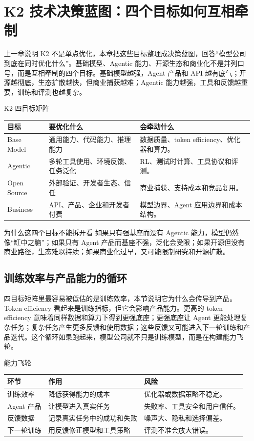 \section{K2 技术决策蓝图：四个目标如何互相牵制}

上一章说明 K2 不是单点优化，本章把这些目标整理成决策蓝图，回答“模型公司到底在同时优化什么”。基础模型、Agentic 能力、开源生态和商业化不是并列口号，而是互相牵制的四个目标。基础模型越强，Agent 产品和 API 越有底气；开源越彻底，生态扩散越快，但商业捕获越难；Agentic 能力越强，工具和反馈越重要，训练和评测也越复杂。

\begin{knowledgebox}{K2 四目标矩阵}
\begin{tabularx}{\textwidth}{p{}p{}p{}}
\toprule
目标 & 要优化什么 & 会牵动什么 \\
\midrule
Base Model & 通用能力、代码能力、推理能力 & 数据质量、token efficiency、优化器和算力。 \\
Agentic & 多轮工具使用、环境反馈、任务泛化 & RL、测试时计算、工具协议和评测。 \\
Open Source & 外部验证、开发者生态、信任 & 商业捕获、支持成本和竞品复用。 \\
Business & API、产品、企业和开发者付费 & 模型边界、Agent 应用边界和成本结构。 \\
\bottomrule
\end{tabularx}
\end{knowledgebox}

\begin{importantbox}{为什么这四个目标不能拆开看}
如果只有强基座而没有 Agentic 能力，模型仍然像“缸中之脑”；如果只有 Agent 产品而基座不强，泛化会受限；如果开源但没有商业路径，生态难以持续；如果商业化过早，又可能限制研究和开源扩散。
\end{importantbox}

\subsection{训练效率与产品能力的循环}

四目标矩阵里最容易被低估的是训练效率，本节说明它为什么会传导到产品。Token efficiency 看起来是训练指标，但它会影响产品能力。更高的 token efficiency 意味着同样数据和算力下得到更强底座；更强底座让 Agent 更能处理复杂任务；复杂任务产生更多反馈和使用数据；这些反馈又可能进入下一轮训练和产品迭代。这个循环如果跑起来，模型公司就不只是训练模型，而是在构建能力飞轮。

\begin{knowledgebox}{能力飞轮}
\begin{tabularx}{\textwidth}{p{}p{}X}
\toprule
环节 & 作用 & 风险 \\
\midrule
训练效率 & 降低获得能力的成本 & 优化器或数据策略不稳定。 \\
Agent 产品 & 让模型进入真实任务 & 失败率、工具安全和用户信任。 \\
反馈数据 & 记录真实任务中的成功和失败 & 噪声大、隐私和选择偏差。 \\
下一轮训练 & 用反馈修正模型和工具策略 & 评测不准会放大错误。 \\
\bottomrule
\end{tabularx}
\end{knowledgebox}

